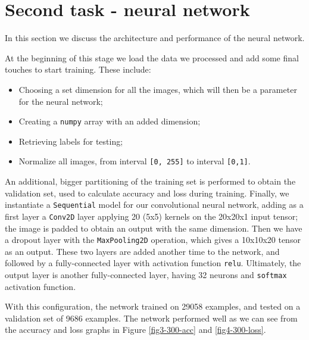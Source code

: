 \vspace{1.5cm} \par
\section*{Second task - neural network}\label{second-task---neural-network}
In this section we discuss the architecture and performance of the neural network.

At the beginning of this stage we load the data we processed and add some final touches to start training. These include:
\begin{itemize}
	\item Choosing a set dimension for all the images, which will then be a parameter for the neural network;
	\item Creating a \texttt{numpy} array with an added dimension;
	\item Retrieving labels for testing;
	\item Normalize all images, from interval \texttt{[0, 255]} to interval \texttt{[0,1]}.
\end{itemize}

An additional, bigger partitioning of the training set is performed to obtain the validation set, used to calculate accuracy and loss during training. Finally, we instantiate a \texttt{Sequential} model for our convolutional neural network, adding as a first layer a \texttt{Conv2D} layer applying 20 (5x5) kernels on the 20x20x1 input tensor; the image is padded to obtain an output with the same dimension. Then we have a dropout layer with the \texttt{MaxPooling2D} operation, which gives a 10x10x20 tensor as an output. These two layers are added another time to the network, and followed by a fully-connected layer with activation function \texttt{relu}. Ultimately, the output layer is another fully-connected layer, having 32 neurons and \texttt{softmax} activation function.

With this configuration, the network trained on 29058 examples, and tested on a validation set of 9686 examples. The network performed well as we can see from the accuracy and loss graphs in Figure \ref{fig3-300-acc} and \ref{fig4-300-loss}.

